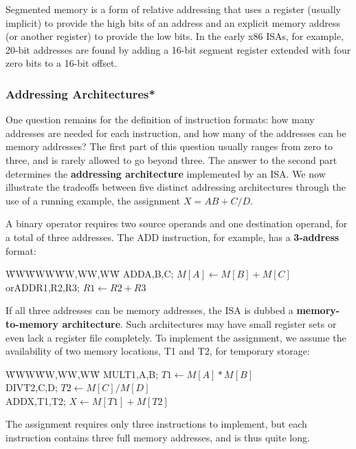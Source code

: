 Segmented memory is a form of relative addressing that uses a register
(usually implicit) to provide the high bits of an address and an
explicit memory address (or another register) to provide the low bits.
In the early x86 ISAs, for example, \mbox{20-bit} addresses are
found by adding a \mbox{16-bit} segment register extended with four
zero bits to a \mbox{16-bit} offset.\\

\vfill

\pagebreak

\subsubsection{Addressing Architectures*}

One question remains for the definition of instruction formats: how
many addresses are needed for each instruction, and how many of the
addresses can be memory addresses?  The first part of this question
usually ranges from zero to three, and is rarely allowed to go
beyond three.  The answer to the second part determines the {\bf
addressing architecture} implemented by an ISA.  We now illustrate the
tradeoffs between five distinct addressing architectures through the
use of a running example, the assignment $X=AB+C/D$.

A binary operator requires two source operands and one destination
operand, for a total of three addresses.  The ADD instruction, for
example, has a {\bf \mbox{3-address}} format:
%
\vspace{-6pt}\begin{tabbing}
\hspace{.5in}\=WW\=WWW\=WW,WW,WW\=\kill
\>\>ADD\>A,B,C\>; $M[A] \leftarrow M[B] + M[C]$\\
\>or\>ADD\>R1,R2,R3\>; $R1 \leftarrow R2 + R3$
\end{tabbing}\vspace{-6pt}
%
If all three addresses can be memory addresses, the ISA is dubbed a
{\bf memory-to-memory architecture}.  Such architectures may have
small register sets or even lack a register file completely.  To
implement the assignment, we assume the availability of two memory
locations, T1 and T2, for temporary storage:
%
\vspace{-6pt}\begin{tabbing}
\hspace{.5in}\=WWW\=WW,WW,WW\=\kill
\>MUL\>T1,A,B\>; $T1 \leftarrow M[A] * M[B]$\\
\>DIV\>T2,C,D\>; $T2 \leftarrow M[C] / M[D]$\\
\>ADD\>X,T1,T2\>; $X \leftarrow M[T1] + M[T2]$
\end{tabbing}\vspace{-6pt}
%
The assignment requires only three instructions to implement, but each
instruction contains three full memory addresses, and is thus quite long.

